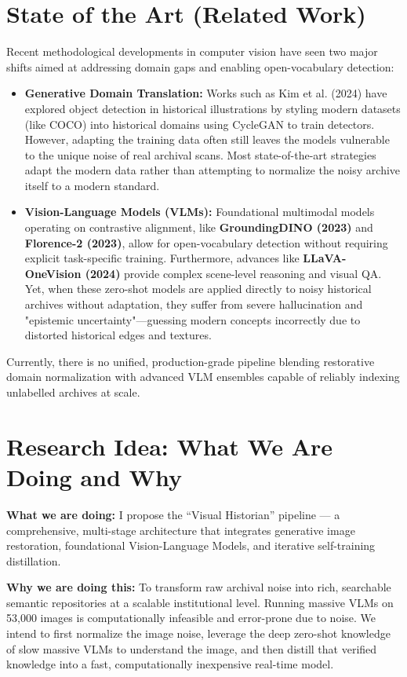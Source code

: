 \documentclass[a4paper, 11pt]{article}
\begin{document}
\section*{State of the Art (Related Work)}
Recent methodological developments in computer vision have seen two major shifts aimed at addressing domain gaps and enabling open-vocabulary detection:
\begin{itemize}
    \item \textbf{Generative Domain Translation:} Works such as Kim et al. (2024) have explored object detection in historical illustrations by styling modern datasets (like COCO) into historical domains using CycleGAN to train detectors. However, adapting the training data often still leaves the models vulnerable to the unique noise of real archival scans. Most state-of-the-art strategies adapt the modern data rather than attempting to normalize the noisy archive itself to a modern standard.
    \item \textbf{Vision-Language Models (VLMs):} Foundational multimodal models operating on contrastive alignment, like \textbf{GroundingDINO (2023)} and \textbf{Florence-2 (2023)}, allow for open-vocabulary detection without requiring explicit task-specific training. Furthermore, advances like \textbf{LLaVA-OneVision (2024)} provide complex scene-level reasoning and visual QA. Yet, when these zero-shot models are applied directly to noisy historical archives without adaptation, they suffer from severe hallucination and "epistemic uncertainty"—guessing modern concepts incorrectly due to distorted historical edges and textures.
\end{itemize}
Currently, there is no unified, production-grade pipeline blending restorative domain normalization with advanced VLM ensembles capable of reliably indexing unlabelled archives at scale.

\section*{Research Idea: What We Are Doing and Why}
\textbf{What we are doing:} I propose the ``Visual Historian'' pipeline — a comprehensive, multi-stage architecture that integrates generative image restoration, foundational Vision-Language Models, and iterative self-training distillation.

\textbf{Why we are doing this:} To transform raw archival noise into rich, searchable semantic repositories at a scalable institutional level. Running massive VLMs on 53,000 images is computationally infeasible and error-prone due to noise. We intend to first normalize the image noise, leverage the deep zero-shot knowledge of slow massive VLMs to understand the image, and then distill that verified knowledge into a fast, computationally inexpensive real-time model.
\end{document}

